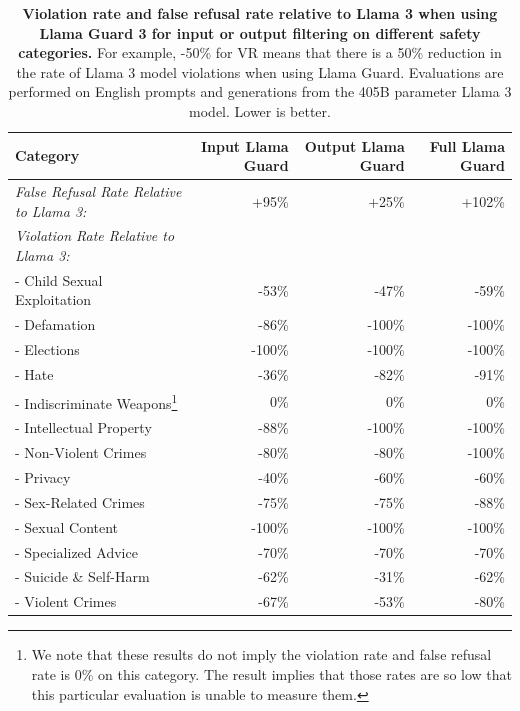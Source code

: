 \documentclass[dvipsnames]{fairmeta}
\begin{document}
\begin{table}[t]
\centering
    \begin{tabular}{lrrr}
    \toprule
    \textbf{Category} & \textbf{Input Llama Guard} & \textbf{Output Llama Guard} & \textbf{Full Llama Guard} \\
    \midrule
    \textit{False Refusal Rate Relative to Llama 3:} & +95\% & +25\% & +102\% \\
    \midrule
    \textit{Violation Rate Relative to Llama 3:} \\
    - Child Sexual Exploitation & -53\% & -47\% & -59\% \\
    - Defamation & -86\% & -100\% & -100\% \\
    - Elections & -100\% & -100\% & -100\% \\
    - Hate & -36\% & -82\% & -91\% \\
    - Indiscriminate Weapons\footnote{We note that these results do not imply the violation rate and false refusal rate is $0\%$ on this category. The result implies that those rates are so low that this particular evaluation is unable to measure them.} & 0\% & 0\% & 0\% \\
    - Intellectual Property & -88\% & -100\% & -100\% \\
    - Non-Violent Crimes & -80\% & -80\% & -100\% \\
    - Privacy & -40\% & -60\% & -60\% \\
    - Sex-Related Crimes & -75\% & -75\% & -88\% \\
    - Sexual Content & -100\% & -100\% & -100\% \\
    - Specialized Advice & -70\% & -70\% & -70\% \\
    - Suicide \& Self-Harm & -62\% & -31\% & -62\% \\
    - Violent Crimes & -67\% & -53\% & -80\% \\
    \bottomrule
    \end{tabular}
    \caption{\textbf{Violation rate and false refusal rate relative to Llama 3 when using Llama Guard 3 for input or output filtering on different safety categories.}  For example, -50\% for VR means that there is a 50\% reduction in the rate of Llama 3 model violations when using Llama Guard.
    Evaluations are performed on English prompts and generations from the 405B parameter Llama 3 model. Lower is better.}
    \label{table:categories_with_sls}
\end{table}
\end{document}
